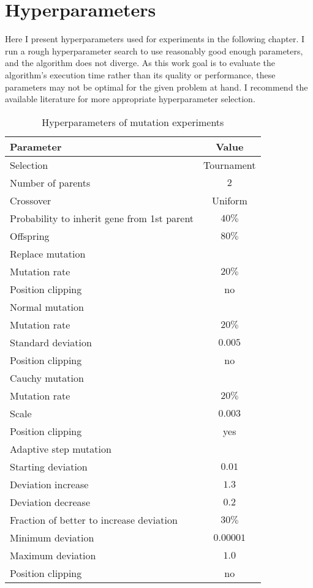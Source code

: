 \chapter{Hyperparameters}
\label{chap:hyperparameters}

Here I present hyperparameters used for experiments in the following chapter. I run a rough hyperparameter search to use reasonably good enough parameters, and the algorithm does not diverge. As this work goal is to evaluate the algorithm's execution time rather than its quality or performance, these parameters may not be optimal for the given problem at hand. I recommend the available literature for more appropriate hyperparameter selection. 

\begin{table}[h]
    \centering
    \begin{tabular}{|l|c|}
        \hline
        \textbf{Parameter} & \textbf{Value} \\
        \hline
        Selection & Tournament \\
        \quad Number of parents & $2$ \\
        Crossover & Uniform \\
        \quad Probability to inherit gene from 1st parent & $40\%$ \\
        \quad Offspring & $80\%$ \\
        \hline
        Replace mutation & \\
        \quad Mutation rate & $20\%$ \\
        \quad Position clipping & no \\
        Normal mutation & \\
        \quad Mutation rate & $20\%$ \\
        \quad Standard deviation & $0.005$ \\
        \quad Position clipping & no \\
        Cauchy mutation & \\
        \quad Mutation rate & $20\%$ \\
        \quad Scale & $0.003$ \\
        \quad Position clipping & yes \\
        Adaptive step mutation & \\
        \quad Starting deviation & $0.01$ \\
        \quad Deviation increase & $1.3$ \\
        \quad Deviation decrease & $0.2$ \\
        \quad Fraction of better to increase deviation & $30\%$ \\
        \quad Minimum deviation & $0.00001$ \\
        \quad Maximum deviation & $1.0$ \\
        \quad Position clipping & no \\
        \hline
    \end{tabular}
    \caption{Hyperparameters of mutation experiments}
    \label{tab:esmutationhyperparmarameters}
\end{table}

